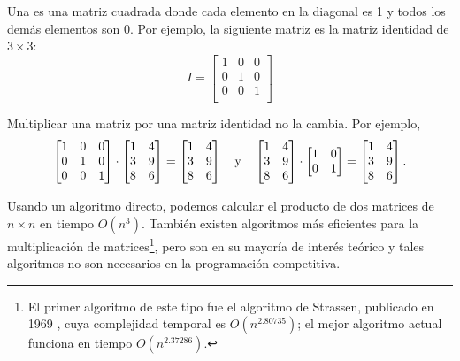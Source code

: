 
Una  es una matriz cuadrada
donde cada elemento en la diagonal es 1
y todos los demás elementos son 0.
Por ejemplo, la siguiente matriz
es la matriz identidad de $3 \times 3$:
\[
 I = \begin{bmatrix}
  1 & 0 & 0 \\
  0 & 1 & 0 \\
  0 & 0 & 1 \\
 \end{bmatrix}
\]

\begin{samepage}
Multiplicar una matriz por una matriz identidad
no la cambia. Por ejemplo,
\[
 \begin{bmatrix}
  1 & 0 & 0 \\
  0 & 1 & 0 \\
  0 & 0 & 1 \\
 \end{bmatrix}
\cdot
 \begin{bmatrix}
  1 & 4 \\
  3 & 9 \\
  8 & 6 \\
 \end{bmatrix}
=
 \begin{bmatrix}
  1 & 4 \\
  3 & 9 \\
  8 & 6 \\
 \end{bmatrix} \hspace{10px} \textrm{y} \hspace{10px}
 \begin{bmatrix}
  1 & 4 \\
  3 & 9 \\
  8 & 6 \\
 \end{bmatrix}
\cdot
 \begin{bmatrix}
  1 & 0 \\
  0 & 1 \\
 \end{bmatrix}
=
 \begin{bmatrix}
  1 & 4 \\
  3 & 9 \\
  8 & 6 \\
 \end{bmatrix}.
\]
\end{samepage}

Usando un algoritmo directo,
podemos calcular el producto de
dos matrices de $n \times n$
en tiempo $O(n^3)$.
También existen algoritmos más eficientes
para la multiplicación de matrices\footnote{El primer
algoritmo de este tipo fue el algoritmo de Strassen,
publicado en 1969 \cite{str69},
cuya complejidad temporal es $O(n^{2.80735})$;
el mejor algoritmo actual \cite{gal14}
funciona en tiempo $O(n^{2.37286})$.},
pero son en su mayoría de interés teórico
y tales algoritmos no son necesarios
en la programación competitiva.


